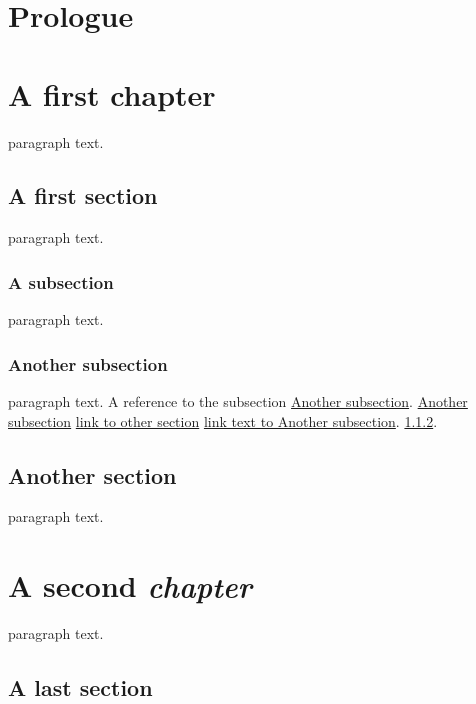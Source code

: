 \chapter*{Prologue}
\label{s:1}
\chapter{A first chapter}
\label{s:2}
\setcounter{tocdepth}{3}
\minitoc

paragraph text.

\section{A first section}
\label{s:3}
paragraph text.

\subsection{A subsection}
\label{s:4}
paragraph text.

\subsection{Another subsection}
\label{s:5}
paragraph text. A reference to the subsection
\hyperref[s:5]{Another subsection}.
\hyperref[s:5]{Another subsection}
\hyperref[s:5]{link to other section}
\hyperref[s:5]{link text to Another subsection}.
\hyperref[s:5]{1.1.2}.

\section{Another section}
\label{s:6}
paragraph text.

\chapter{A second \emph{chapter}}
\label{s:7}
paragraph text.

\section{A last section}
\label{s:8}
\setcounter{tocdepth}{3}
\tableofcontents
\setcounter{tocdepth}{0}
\tableofcontents
\setcounter{tocdepth}{3}
\tableofcontents
\setcounter{tocdepth}{3}
\tableofcontents
\setcounter{tocdepth}{3}
\minitoc

